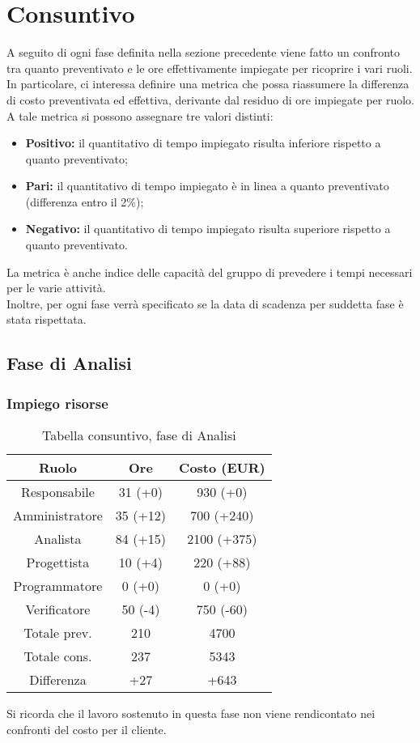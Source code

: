 \section{Consuntivo}

A seguito di ogni fase definita nella sezione precedente viene fatto un confronto tra quanto preventivato e le ore effettivamente impiegate per ricoprire i vari ruoli. In particolare, ci interessa definire una metrica che possa riassumere la differenza di costo preventivata ed effettiva, derivante dal residuo di ore impiegate per ruolo. \\ A tale metrica si possono assegnare tre valori distinti:
\begin{itemize}
	\item \textbf{Positivo:} il quantitativo di tempo impiegato risulta inferiore rispetto a quanto preventivato;
	\item \textbf{Pari:} il quantitativo di tempo impiegato è in linea a quanto preventivato (differenza entro il 2\%);
	\item \textbf{Negativo:} il quantitativo di tempo impiegato risulta superiore rispetto a quanto preventivato.
\end{itemize}
La metrica è anche indice delle capacità del gruppo di prevedere i tempi necessari per le varie attività.
\\Inoltre, per ogni fase verrà specificato se la data di scadenza per suddetta fase è stata rispettata.
\subsection{Fase di Analisi}
\subsubsection{Impiego risorse}
\begin{table}[h]
\caption{Tabella consuntivo, fase di Analisi}  
\begin{center}
\begin{tabular}{ |c|c|c|  }
 \hline
 Ruolo 		& Ore & Costo (EUR)\\
 \hline\hline
	Responsabile	& 31 (+0) & 930 (+0)\\
	Amministratore	& 35 (+12) & 700 (+240)\\
	Analista		& 84 (+15) & 2100 (+375)\\
	Progettista		& 10 (+4) & 220 (+88)\\
	Programmatore	& 0 (+0) & 0 (+0)\\
	Verificatore	& 50 (-4) & 750 (-60)\\
	\hline\hline
	Totale prev.	& 210 & 4700 \\
	Totale cons.	& 237 & 5343 \\
	Differenza		& +27 & +643 \\
 \hline
\end{tabular}
\end{center}
\end{table}
Si ricorda che il lavoro sostenuto in questa fase non viene rendicontato nei confronti del costo per il cliente.
